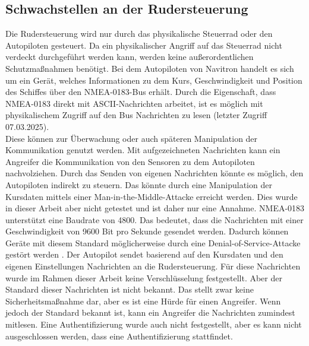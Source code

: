 \subsection{Schwachstellen an der Rudersteuerung}
Die Rudersteuerung wird nur durch das physikalische Steuerrad oder den Autopiloten gesteuert. Da ein physikalischer
Angriff auf das Steuerrad nicht verdeckt durchgeführt werden kann, werden keine außerordentlichen Schutzmaßnahmen benötigt.
Bei dem Autopiloten von Navitron handelt es sich um ein Gerät, welches Informationen zu dem Kurs, Geschwindigkeit und
Position des Schiffes über den NMEA-0183-Bus erhält. Durch die Eigenschaft, dass NMEA-0183 direkt mit ASCII-Nachrichten
arbeitet, ist es möglich mit physikalischem Zugriff auf den Bus Nachrichten zu lesen \cite{nmea0183} (letzter Zugriff 07.03.2025). \\
Diese können zur Überwachung oder auch späteren Manipulation der Kommunikation genutzt werden. Mit aufgezeichneten Nachrichten
kann ein Angreifer die Kommunikation von den Sensoren zu dem Autopiloten nachvolziehen. Durch das Senden von eigenen Nachrichten
könnte es möglich, den Autopiloten indirekt zu steuern. Das könnte durch eine Manipulation der Kursdaten mittels einer Man-in-the-Middle-Attacke
erreicht werden. Dies wurde in dieser Arbeit aber nicht getestet und ist daher nur eine Annahme. 
NMEA-0183 unterstützt eine Baudrate von 4800. Das bedeutet, dass die Nachrichten mit einer Geschwindigkeit von 9600 Bit pro Sekunde
gesendet werden. Dadurch können Geräte mit diesem Standard möglicherweise durch eine Denial-of-Service-Attacke gestört werden \cite{Tran2021}.
Der Autopilot sendet basierend auf den Kursdaten und den eigenen Einstellungen Nachrichten an die Rudersteuerung. Für diese 
Nachrichten wurde im Rahmen dieser Arbeit keine Verschlüsselung festgestellt. Aber der Standard dieser Nachrichten ist nicht
bekannt. Das stellt zwar keine Sicherheitsmaßnahme dar, aber es ist eine Hürde für einen Angreifer. Wenn jedoch 
der Standard bekannt ist, kann ein Angreifer die Nachrichten zumindest mitlesen. Eine Authentifizierung wurde auch
nicht festgestellt, aber es kann nicht ausgeschlossen werden, dass eine Authentifizierung stattfindet.\\


